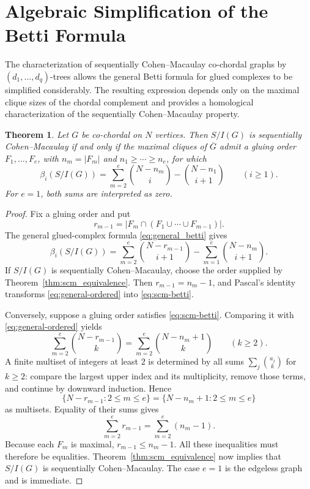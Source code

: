\documentclass[12pt, reqno]{amsart}
\newtheorem{theorem}{Theorem}[section]
\theoremstyle{definition}
\numberwithin{equation}{section}
\begin{document}
	\section{Algebraic Simplification of the Betti Formula}\label{sec:main}
	
	The characterization of sequentially Cohen--Macaulay co-chordal graphs by $(d_1,\ldots,d_q)$-trees allows the general Betti formula for glued complexes to be simplified considerably. The resulting expression depends only on the maximal clique sizes of the chordal complement and provides a homological characterization of the sequentially Cohen--Macaulay property.
	
	\begin{theorem}\label{thm:seq_cm_betti_iff}
Let $G$ be co-chordal on $N$ vertices.  Then $S/I(G)$ is sequentially Cohen--Macaulay if and only if the maximal cliques of $\overline G$ admit a gluing order $F_1,\ldots,F_e$, with $n_m=|F_m|$ and $n_1\ge\cdots\ge n_e$, for which
\begin{equation}\label{eq:scm-betti}
\beta_i(S/I(G))
=
\sum_{m=2}^{e}\binom{N-n_m}{i}
-
\binom{N-n_1}{i+1}
\qquad(i\ge1).
\end{equation}
For $e=1$, both sums are interpreted as zero.
\end{theorem}
\begin{proof}
Fix a gluing order and put
\[
r_{m-1}=\bigl|F_m\cap(F_1\cup\cdots\cup F_{m-1})\bigr|.
\]
The general glued-complex formula \eqref{eq:general_betti} gives
\begin{equation}\label{eq:general-ordered}
\beta_i(S/I(G))
=
\sum_{m=2}^{e}\binom{N-r_{m-1}}{i+1}
-
\sum_{m=1}^{e}\binom{N-n_m}{i+1}.
\end{equation}
If $S/I(G)$ is sequentially Cohen--Macaulay, choose the order supplied by Theorem~\ref{thm:scm_equivalence}.  Then $r_{m-1}=n_m-1$, and Pascal's identity transforms \eqref{eq:general-ordered} into \eqref{eq:scm-betti}.

Conversely, suppose a gluing order satisfies \eqref{eq:scm-betti}.  Comparing it with \eqref{eq:general-ordered} yields
\[
\sum_{m=2}^{e}\binom{N-r_{m-1}}{k}
=
\sum_{m=2}^{e}\binom{N-n_m+1}{k}
\qquad(k\ge2).
\]
A finite multiset of integers at least $2$ is determined by all sums $\sum_j\binom{a_j}{k}$ for $k\ge2$: compare the largest upper index and its multiplicity, remove those terms, and continue by downward induction.  Hence
\[
\{N-r_{m-1}:2\le m\le e\}
=
\{N-n_m+1:2\le m\le e\}
\]
as multisets.  Equality of their sums gives
\[
\sum_{m=2}^{e}r_{m-1}=\sum_{m=2}^{e}(n_m-1).
\]
Because each $F_m$ is maximal, $r_{m-1}\le n_m-1$.  All these inequalities must therefore be equalities.  Theorem~\ref{thm:scm_equivalence} now implies that $S/I(G)$ is sequentially Cohen--Macaulay.  The case $e=1$ is the edgeless graph and is immediate.
\end{proof}
	
\end{document}
